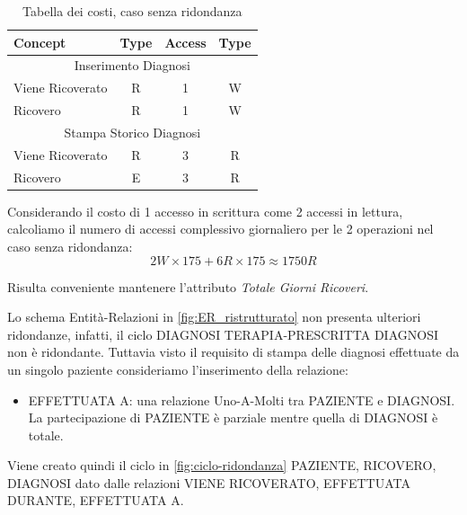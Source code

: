 \documentclass{article}
\begin{document}
\begin{table}[H]
	\centering
	\begin{tabular}{|l|c|c|c|}
		\hline
		\textbf{Concept} & \textbf{Type} & \textbf{Access} & \textbf{Type} \\ \hline
		\multicolumn{4}{|c|}{Inserimento Diagnosi}                         \\ \hline
		Viene Ricoverato & R             & 1               & W             \\ \hline
		Ricovero         & R             & 1               & W             \\ \hline
		\multicolumn{4}{|c|}{Stampa Storico Diagnosi}                      \\ \hline
		Viene Ricoverato & R             & 3               & R             \\ \hline
		Ricovero         & E             & 3               & R             \\ \hline
	\end{tabular}
	\caption{Tabella dei costi, caso senza ridondanza}
	\label{tab:costi-no-attributo-ridondante}
\end{table}

Considerando il costo di 1 accesso in scrittura come 2 accessi in lettura, calcoliamo il numero di accessi complessivo giornaliero per le 2 operazioni nel caso senza ridondanza:
\begin{equation}
	2W \times 175 + 6R \times 175 \approx 1750R
\end{equation}

Risulta conveniente mantenere l'attributo \textit{Totale Giorni Ricoveri}.

Lo schema Entità-Relazioni in \autoref{fig:ER_ristrutturato} non presenta ulteriori ridondanze, infatti, il ciclo DIAGNOSI TERAPIA-PRESCRITTA DIAGNOSI non è ridondante. Tuttavia visto il requisito di stampa delle diagnosi effettuate da un singolo paziente consideriamo l'inserimento della relazione:
\begin{itemize}
	\item EFFETTUATA A: una relazione Uno-A-Molti tra PAZIENTE
	      e DIAGNOSI. La partecipazione di PAZIENTE è parziale mentre quella
	      di DIAGNOSI è totale.
\end{itemize}

Viene creato quindi il ciclo in \autoref{fig:ciclo-ridondanza} PAZIENTE, RICOVERO, DIAGNOSI dato dalle relazioni VIENE RICOVERATO, EFFETTUATA DURANTE, EFFETTUATA A.
\end{document}
